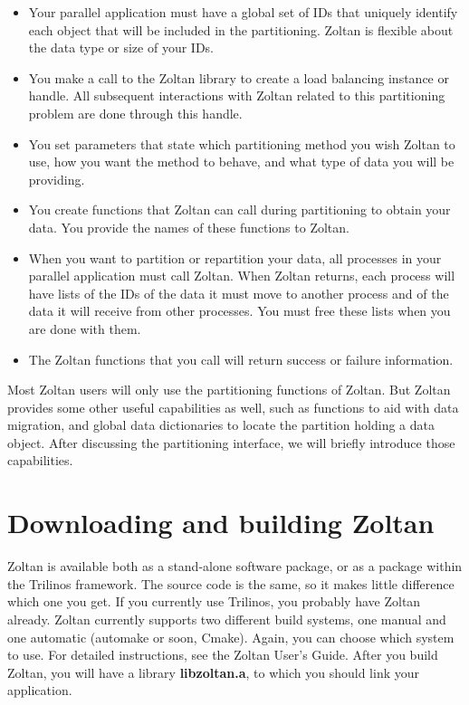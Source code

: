 \begin{itemize}
\item Your parallel application must have a global set of IDs that uniquely identify each object that will be included in the partitioning.  Zoltan is flexible about the data type or size of your IDs.
\item You make a call to the Zoltan library to create a load balancing instance or handle.  All subsequent interactions with Zoltan related to this partitioning problem are done through this handle.
\item You set parameters that state which partitioning method you wish Zoltan to use, how you want the method to behave, and what type of data you will be providing.
\item You create functions that Zoltan can call during partitioning to obtain your data.  You provide the names of these functions to Zoltan.
\item When you want to partition or repartition your data, all processes in your parallel application must call Zoltan.  When Zoltan returns, each process will have lists of the
IDs of the data it must move to another process and of the data it will receive from
other processes.  You must free these lists when you are done with them.
\item The Zoltan functions that you call will return success or failure information.
\end{itemize}

Most Zoltan users will only use the partitioning functions of Zoltan.  But Zoltan provides
some other useful capabilities as well, such as functions to aid with data migration, and
global data dictionaries to locate the partition holding a data object.
After discussing the partitioning interface, we will briefly introduce those capabilities.

\section{Downloading and building Zoltan}

Zoltan is available both as a stand-alone software package, or
as a package within the Trilinos framework. The source code
is the same, so it makes little difference which one you get.
If you currently use Trilinos, you probably have Zoltan already.
Zoltan currently supports two different build systems, one manual
and one automatic (automake or soon, Cmake). Again, you can choose
which system to use. For detailed instructions, see the Zoltan User's Guide.
After you build Zoltan, you will have a library \textbf{libzoltan.a},
to which you should link your application.


